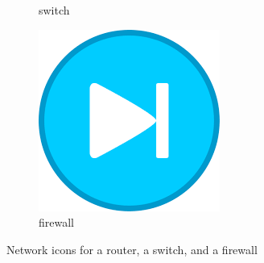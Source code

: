 {\begin{figure}[hb]
\begin{subfigure}[b]{18mm}
   \caption{switch}
   \label{fig:icon-switch}
   \end{subfigure}
   \qquad
   \begin{subfigure}[b]{18mm}
   \includegraphics[width=\textwidth]{images/firewall.png}
   \caption{firewall}
   \label{fig:icon-firewall}
   \end{subfigure}
   \caption{Network icons for a router, a switch, and a firewall}
   \label{fig:icons}
\end{figure}
}
